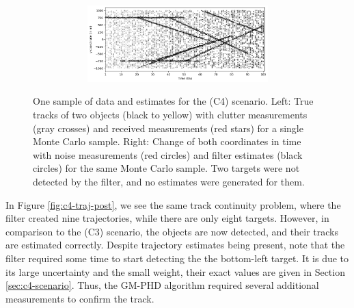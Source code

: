 \begin{figure}
\begin{subfigure}[]{0.48\linewidth}
\begin{subfigure}[b]{\linewidth}
            \includegraphics[width=\linewidth]{figures/c4-y-estimates.png}
        \end{subfigure}
    \end{subfigure}
  \caption[One sample of data and estimates for the (C4) scenario.]{One sample of data and estimates for the (C4) scenario. Left: True tracks of two objects (black to yellow) with clutter measurements (gray crosses) and received measurements (red stars) for a single Monte Carlo sample. Right: Change of both coordinates in time with noise measurements (red circles) and filter estimates (black circles) for the same Monte Carlo sample. Two targets were not detected by the filter, and no estimates were generated for them.}
  \label{fig:c4-results-overview}
\end{figure}

In Figure \ref{fig:c4-traj-post}, we see the same track continuity problem, where the filter created nine trajectories, while there are only eight targets. However, in comparison to the (C3) scenario, the objects are now detected, and their tracks are estimated correctly. Despite trajectory estimates being present, note that the filter required some time to start detecting the the bottom-left target. It is due to its large uncertainty and the small weight, their exact values are given in Section \ref{sec:c4-scenario}. Thus, the GM-PHD algorithm required several additional measurements to confirm the track.

